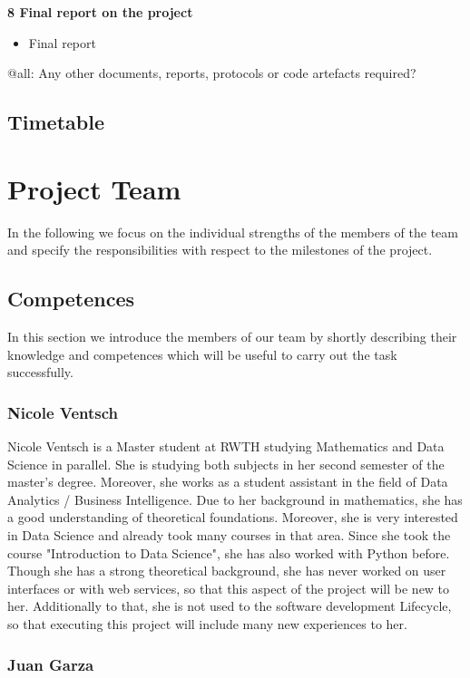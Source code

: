 \documentclass[notitlepage]{article}
\begin{document}
\begin{flushleft}
\textbf{8 Final report on the project}
\\
\begin{itemize}
	\item Final report
\end{itemize}

{\color{red} @all: Any other documents, reports, protocols or code artefacts required?}

\subsection{Timetable}

\section{Project Team}
In the following we focus on the individual strengths of the members of the team and specify the responsibilities with respect to the milestones of the project.

\subsection{Competences} 
In this section we introduce the members of our team by shortly describing their knowledge and competences which will be useful to carry out the task successfully.

\subsubsection*{Nicole Ventsch}

Nicole Ventsch is a Master student at RWTH studying Mathematics and Data Science in parallel. She is studying both subjects in her second semester of the master's degree. Moreover, she works as a student assistant in the field of Data Analytics / Business Intelligence. Due to her background in mathematics, she has a good understanding of theoretical foundations. Moreover, she is very interested in Data Science and already took many courses in that area. Since she took the course "Introduction to Data Science", she has also worked with Python before. Though she has a strong theoretical background, she has never worked on user interfaces or with web services, so that this aspect of the project will be new to her. Additionally to that, she is not used to the software development Lifecycle, so that executing this project will include many new experiences to her. 

\subsubsection*{Juan Garza}


\end{flushleft}
\end{document}
